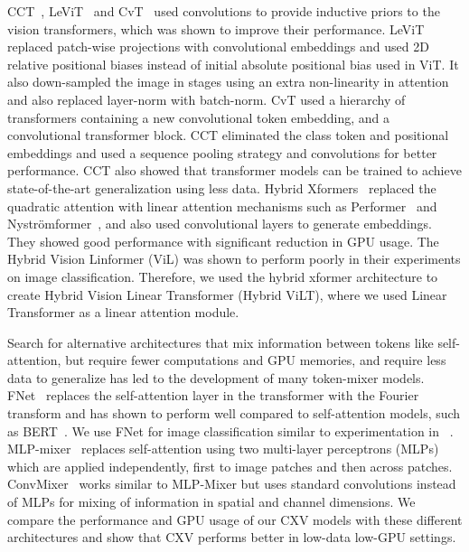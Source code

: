 \documentclass{article}
\begin{document}
CCT~\cite{hassani2021escaping}, LeViT~\cite{graham2021levit} and CvT~\cite{wu2021cvt} used convolutions to provide inductive priors to the vision transformers, which was shown to improve their performance. LeViT replaced patch-wise projections with convolutional embeddings and used 2D relative positional biases instead of initial absolute positional bias used in ViT. It also down-sampled the image in stages using an extra non-linearity in attention and also replaced layer-norm with batch-norm. CvT used a hierarchy of transformers containing a new convolutional token embedding, and a convolutional transformer block. CCT eliminated the class token and positional embeddings and used a sequence pooling strategy and convolutions for better performance. CCT also showed that transformer models can be trained to achieve state-of-the-art generalization using less data. Hybrid Xformers~\cite{jeevan2021vision} replaced the quadratic attention with linear attention mechanisms such as Performer~\cite{choromanski2021rethinking} and Nyströmformer~\cite{xiong2021nystromformer}, and also used convolutional layers to generate embeddings. They showed good performance with significant reduction in GPU usage. The Hybrid Vision Linformer (ViL) was shown to perform poorly in their experiments on image classification. Therefore, we used the hybrid xformer architecture to create Hybrid Vision Linear Transformer (Hybrid ViLT), where we used Linear Transformer as a linear attention module. 

Search for alternative architectures that mix information between tokens like self-attention, but require fewer computations and GPU memories, and require less data to generalize has led to the development of many token-mixer models. FNet~\cite{leethorp2021fnet} replaces the self-attention layer in the transformer with the Fourier transform and has shown to perform well compared to self-attention models, such as BERT~\cite{devlin2019bert}. We use FNet for image classification similar to experimentation in ~\cite{jeevan2021vision}. MLP-mixer~\cite{tolstikhin2021mlpmixer} replaces self-attention using two multi-layer perceptrons (MLPs) which are applied independently, first to image patches and then across patches. ConvMixer~\cite{anonymous2022patches} works similar to MLP-Mixer but uses standard convolutions instead of MLPs for mixing of information in spatial and channel dimensions. We compare the performance and GPU usage of our CXV models with these different architectures and show that CXV performs better in low-data low-GPU settings. 
\end{document}
